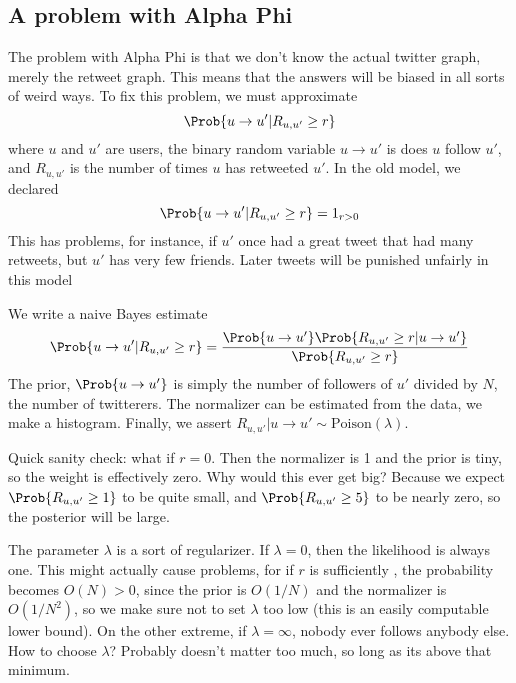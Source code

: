 \subsection*{A problem with Alpha Phi}

The problem with Alpha Phi is that we don't know the actual twitter graph, merely the retweet graph.
This means that the answers will be biased in all sorts of weird ways.
To fix this problem, we must approximate
\[\Prob{u\to u'|R_{u,u'}\ge r}\]
where $u$ and $u'$ are users, the binary random variable $u\to u'$ is does $u$ follow $u'$, and $R_{u,u'}$ is the number of times $u$ has retweeted $u'$.
In the old model, we declared 
\[\Prob{u\to u'|R_{u,u'}\ge r} = 1_{r>0}\]
This has problems, for instance, if $u'$ once had a great tweet that had many retweets, but $u'$ has very few friends.
Later tweets will be punished unfairly in this model

We write a naive Bayes estimate
\[\Prob{u\to u'|R_{u,u'}\ge r} = \frac{\Prob{u\to u'}\Prob{R_{u,u'}\ge r|u\to u'}}{\Prob{R_{u,u'}\ge r}}\]
The prior, $\Prob{u\to u'}$ is simply the number of followers of $u'$ divided by $N$, the number of twitterers.
The normalizer can be estimated from the data, we make a histogram.  
Finally, we assert $R_{u,u'}|u\to u'\sim \mbox{Poison}(\lambda)$.

Quick sanity check: what if $r=0$.  Then the normalizer is 1 and the prior is tiny, so the weight is effectively zero.
Why would this ever get big?  Because we expect $\Prob{R_{u,u'}\ge 1}$ to be quite small, and $\Prob{R_{u,u'}\ge 5}$ to be nearly zero, so the posterior will be large.  

The parameter $\lambda$ is a sort of regularizer.  If $\lambda=0$, then the likelihood is always one.  This might actually cause problems, for if $r$ is sufficiently , the probability becomes $O(N)>0$, since the prior is $O(1/N)$ and the normalizer is $O(1/N^2)$, so we make sure not to set $\lambda$ too low (this is an easily computable lower bound). 
On the other extreme, if $\lambda=\infty$, nobody ever follows anybody else.  
How to choose $\lambda$?  Probably doesn't matter too much, so long as its above that minimum.
